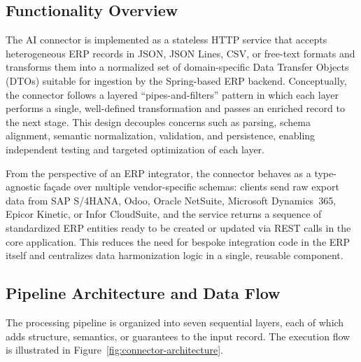 \documentclass{article}
\begin{document}
\subsection{Functionality Overview}
The AI connector is implemented as a stateless HTTP service that accepts heterogeneous ERP
records in JSON, JSON Lines, CSV, or free-text formats and transforms them into a normalized
set of domain-specific Data Transfer Objects (DTOs) suitable for ingestion by the Spring-based
ERP backend.
Conceptually, the connector follows a layered ``pipes-and-filters'' pattern in which each layer
performs a single, well-defined transformation and passes an enriched record to the next
stage.\autocite{hohpe2004enterprise,nexla2024enterprise}
This design decouples concerns such as parsing, schema alignment, semantic normalization,
validation, and persistence, enabling independent testing and targeted optimization of each
layer.

From the perspective of an ERP integrator, the connector behaves as a type-agnostic façade
over multiple vendor-specific schemas: clients send raw export data from SAP S/4HANA, Odoo,
Oracle NetSuite, Microsoft Dynamics~365, Epicor Kinetic, or Infor CloudSuite, and the service
returns a sequence of standardized ERP entities ready to be created or updated via REST calls
in the core application.\autocite{dataforest2026integration}
This reduces the need for bespoke integration code in the ERP itself and centralizes data
harmonization logic in a single, reusable component.

\subsection{Pipeline Architecture and Data Flow}
The processing pipeline is organized into seven sequential layers, each of which adds
structure, semantics, or guarantees to the input record. The execution flow is illustrated in
Figure~\ref{fig:connector-architecture}.
\end{document}
